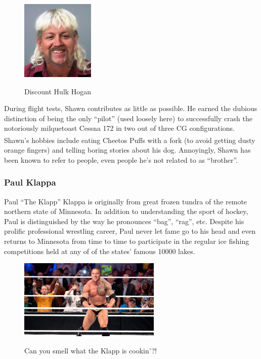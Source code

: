 \documentclass[conf]{new-aiaa}
\begin{document}
\begin{figure}[hbt!]
	\centering
	\includegraphics[height=1.5in]{ShawnExotic2.jpg}
	\label{PAVSLOGO}
	\caption{Discount Hulk Hogan}
\end{figure}

During flight tests, Shawn contributes as little as possible.  He earned the dubious distinction of being the only ``pilot'' (used loosely here) to successfully crash the notoriously milquetoast Cessna 172 in two out of three CG configurations. Shawn's hobbies include eating Cheetos Puffs\textsuperscript{\textregistered} with a fork (to avoid getting dusty orange fingers) and telling boring stories about his dog.  Annoyingly, Shawn has been known to refer to people, even people he's not related to as ``brother''.

\subsubsection{Paul Klappa}

Paul ``The Klapp'' Klappa is originally from great frozen tundra of the remote northern state of Minnesota. In addition to understanding the sport of hockey, Paul is distinguished by the way he pronounces ``bag'', ``rag'', etc. Despite his prolific professional wrestling career, Paul never let fame go to his head and even returns to Minnesota from time to time to participate in the regular ice fishing competitions held at any of of the states' famous \num{10000} lakes.

\begin{figure}[hbt!]
	\centering
	\includegraphics[height=1.5in]{KlappIsCookin2.jpg}
	\label{PAVSLOGO}
	\caption{Can you smell what the Klapp is cookin'?!}
\end{figure}	
\end{document}
